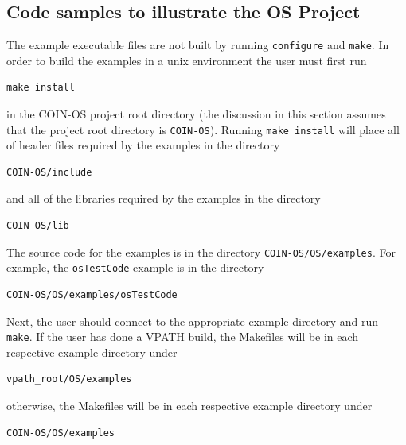 \documentclass[11pt]{article}
\renewcommand{\_}{{\char"5F}}
\renewcommand{\{}{{\char"7B}}
\renewcommand{\}}{{\char"7D}}
\renewcommand{\^}{{\char"0D}}
\renewcommand{\'}{{\char"0D}}
\newcommand{\UrlKippFileupload}{http://gsbkip.chicagogsb.edu/os/fileupload.html}
\begin{document}
\begin{enumerate}[Step 1:]

{}



\section{Code samples to illustrate the OS Project}\label{section:examples}

The example executable files are not built by running {\tt configure} and {\tt make}.  In order to build the examples
in a unix environment the user must first run
\begin{verbatim}
make install
\end{verbatim}
in the COIN-OS project root directory (the discussion in this section assumes that the project root directory is
{\tt COIN-OS}).  Running {\tt make install}  will  place all of header files required by the examples in the directory
\begin{verbatim}
COIN-OS/include
\end{verbatim}
and all of the libraries required by the examples in the directory
\begin{verbatim}
COIN-OS/lib
\end{verbatim}
The source code for the examples is in the directory {\tt COIN-OS/OS/examples}.  For example, the {\tt osTestCode}
example is in the directory
\begin{verbatim}
COIN-OS/OS/examples/osTestCode
\end{verbatim}
Next, the user should connect to the appropriate example directory and run {\tt make}.
If the user has done a VPATH build, the Makefiles will be in each respective example directory under
\begin{verbatim}
vpath_root/OS/examples
\end{verbatim}
otherwise, the Makefiles will be in each respective example directory under
\begin{verbatim}
COIN-OS/OS/examples
\end{verbatim}


\end{enumerate}
\end{document}
